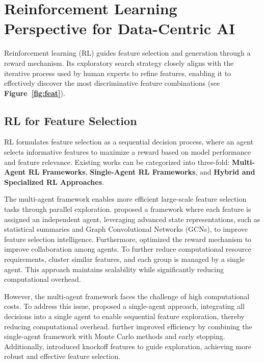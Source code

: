 \section{Reinforcement Learning Perspective for Data-Centric AI}

Reinforcement learning (RL) guides feature selection and generation through a reward mechanism. Its exploratory search strategy closely aligns with the iterative process used by human experts to refine features, enabling it to effectively discover the most discriminative feature combinations (see \textbf{Figure~\ref{fig:feat}}).

\subsection{RL for Feature Selection}
RL formulates feature selection as a sequential decision process, where an agent selects informative features to maximize a reward based on model performance and feature relevance. Existing works can be categorized into three-fold: \textbf{Multi-Agent RL Frameworks}, \textbf{Single-Agent RL Frameworks}, and \textbf{Hybrid and Specialized RL Approaches}. 

The multi-agent framework enables more efficient large-scale feature selection tasks through parallel exploration. \cite{liu2019automating} proposed a framework where each feature is assigned an independent agent, leveraging advanced state representations, such as statistical summaries and Graph Convolutional Networks (GCNs), to improve feature selection intelligence. Furthermore, \cite{liu2021automated} optimized the reward mechanism to improve collaboration among agents. To further reduce computational resource requirements, \cite{fan2021autogfs} cluster similar features, and each group is managed by a single agent. This approach maintains scalability while significantly reducing computational overhead.

However, the multi-agent framework faces the challenge of high computational costs. To address this issue, \cite{zhao2020simplifying} proposed a single-agent approach, integrating all decisions into a single agent to enable sequential feature exploration, thereby reducing computational overhead. \cite{liu2021efficient} further improved efficiency by combining the single-agent framework with Monte Carlo methods and early stopping. Additionally, \cite{wang2024knockoff} introduced knockoff features to guide exploration, achieving more robust and effective feature selection.

